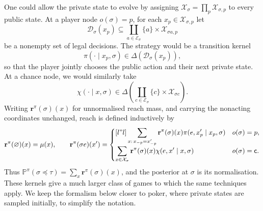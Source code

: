 \documentclass[12pt, a4paper]{article}
\begin{document}
\begin{remark}
One could allow the private state to evolve by assigning
$\mathcal X_\sigma=\prod_p\mathcal X_{\sigma,p}$ to every public state.  At a
player node $o(\sigma)=p$, for each $x_p\in\mathcal X_{\sigma,p}$ let
\[
  \mathcal D_\sigma(x_p)\subseteq
  \coprod_{a\in\mathcal E_\sigma}
  \{a\}\times\mathcal X_{\sigma a,p}
\]
be a nonempty set of legal decisions.  The strategy would be a transition
kernel
\[
  \pi(\cdot\mid x_p,\sigma)\in\Delta(\mathcal D_\sigma(x_p)),
\]
so that the player jointly chooses the public action and their next private
state.  At a chance node, we would similarly take
\[
  \chi(\cdot\mid x,\sigma)\in
  \Delta\!\left(\coprod_{c\in\mathcal E_\sigma}
  \{c\}\times\mathcal X_{\sigma c}\right).
\]
Writing $\mathbf r^\pi(\sigma)(x)$ for unnormalised reach mass, and carrying
the nonacting coordinates unchanged, reach is defined inductively by
\[
\mathbf r^\pi(\varnothing)(x)=\mu(x),\qquad
\mathbf r^\pi(\sigma e)(x')=
\begin{cases}[l"l]
\displaystyle\sum_{x:\,x_{-p}=x'_{-p}}
\mathbf r^\pi(\sigma)(x)\pi(e,x'_p\mid x_p,\sigma)
& o(\sigma)=p,\\
\displaystyle\sum_{x\in\mathcal X_\sigma}
\mathbf r^\pi(\sigma)(x)\chi(e,x'\mid x,\sigma)
& o(\sigma)=\mathsf c.
\end{cases}
\]
Thus $\mathbb P^\pi(\sigma\preccurlyeq\tau)=\sum_x\mathbf r^\pi(\sigma)(x)$,
and the posterior at $\sigma$ is its normalisation.  These kernels give a much
larger class of games to which the same techniques apply.  We keep the
formalism below closer to poker, where private states are sampled initially,
to simplify the notation.
\end{remark}
\end{document}
